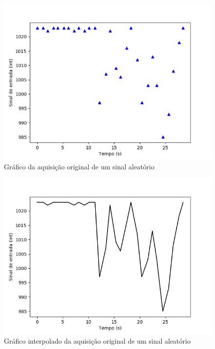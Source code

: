 \begin{figure}[h!]
	\begin{center}
		\includegraphics[width=1\linewidth]{images/funcao_original.png}
		\caption{Gráfico da aquisição original de um sinal aleatório}
		\label{fig:funcaoOriginal}
	\end{center}
\end{figure}

\begin{figure}[h!]
	\begin{center}
		\includegraphics[width=1\linewidth]{images/funcao_original_interpolada.png}
		\caption{Gráfico interpolado da aquisição original de um sinal aleatório}
		\label{fig:funcaoOriginalInterpolada}
	\end{center}
\end{figure}

